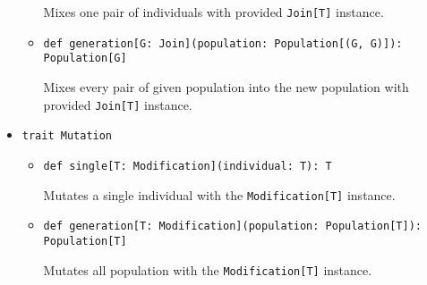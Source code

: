 \begin{itemize}
\begin{itemize}
	Mixes one pair of individuals with provided \texttt{Join[T]} instance.

	\item \texttt{def generation[G: Join](population: Population[(G, G)]): Population[G]}

	Mixes every pair of given population into the new population with provided \texttt{Join[T]} instance.
\end{itemize}

\smallskip
\item \texttt{trait Mutation}
\begin{itemize}
	\item \texttt{def single[T: Modification](individual: T): T}

	Mutates a single individual with the \texttt{Modification[T]} instance.

	\item \texttt{def generation[T: Modification](population: Population[T]): Population[T]}

	Mutates all population with the \texttt{Modification[T]} instance.
\end{itemize}

\end{itemize}

